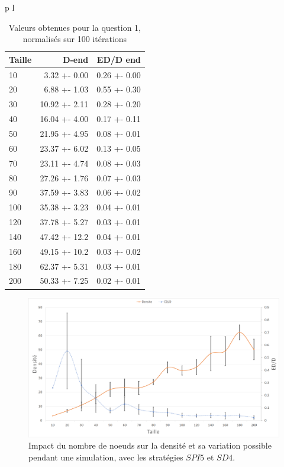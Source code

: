 \documentclass[a4paper]{article}
\begin{document}
\begin{minipage}{0.35\textwidth}
\begin{tabular}{p{\textwidth} l}
\begin{table}[H]
  \centering
  \begin{tabular}{|l|r|r|}
    \hline
    Taille & D-end & ED/D end \\ \hline
    10  &  3.32 +- 0.00 & 0.26 +- 0.00 \\ \hline
     20  &  6.88 +- 1.03 & 0.55 +- 0.30 \\ \hline
     30  & 10.92 +- 2.11 & 0.28 +- 0.20 \\ \hline
     40  & 16.04 +- 4.00 & 0.17 +- 0.11 \\ \hline
     50  & 21.95 +- 4.95 & 0.08 +- 0.01 \\ \hline
     60  & 23.37 +- 6.02 & 0.13 +- 0.05 \\ \hline
     70  & 23.11 +- 4.74 & 0.08 +- 0.03 \\ \hline
     80  & 27.26 +- 1.76 & 0.07 +- 0.03 \\ \hline
     90  & 37.59 +- 3.83 & 0.06 +- 0.02 \\ \hline
     100 & 35.38 +- 3.23 & 0.04 +- 0.01 \\ \hline
     120 & 37.78 +- 5.27 & 0.03 +- 0.01 \\ \hline
     140 & 47.42 +- 12.2 & 0.04 +- 0.01 \\ \hline
     160 & 49.15 +- 10.2 & 0.03 +- 0.02 \\ \hline
     180 & 62.37 +- 5.31 & 0.03 +- 0.01 \\ \hline
     200 & 50.33 +- 7.25 & 0.02 +- 0.01 \\ \hline
  \end{tabular}
  \caption{Valeurs obtenues pour la question 1, normalisés sur 100 itérations}
\end{table}
\end{tabular}
\end{minipage}

\vfill

\begin{figure}[H]
\begin{minipage}{\textwidth}
  \centering
    \includegraphics[width=\textwidth]{images/ex2.png}
    \caption{Impact du nombre de noeuds sur la densité et sa variation possible
      pendant une simulation, avec les stratégies $SPI5$ et $SD4$.}
\end{minipage}
\end{figure}
\end{document}

